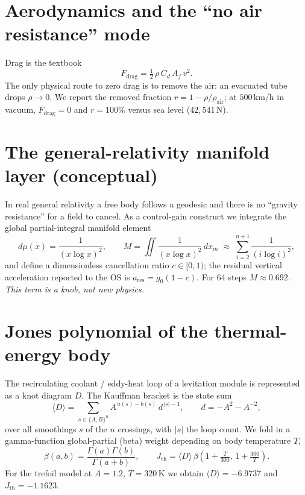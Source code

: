 \documentclass[11pt]{article}
\begin{document}
\section{Aerodynamics and the ``no air resistance'' mode}
Drag is the textbook
\begin{equation}
F_{\text{drag}}=\tfrac12\,\rho\,C_d\,A_f\,v^2 .
\end{equation}
The only physical route to zero drag is to remove the air: an evacuated tube
drops $\rho\to0$. We report the removed fraction
$r=1-\rho/\rho_{\text{air}}$; at $500\,$km/h in vacuum, $F_{\text{drag}}=0$ and
$r=100\%$ versus sea level ($42{,}541\,$N).

\section{The general-relativity manifold layer (conceptual)}
\label{sec:manifold}
In real general relativity a free body follows a geodesic and there is no
``gravity resistance'' for a field to cancel. As a control-gain construct we
integrate the global partial-integral manifold element
\begin{equation}
d\mu(x)=\frac{1}{(x\log x)^2},\qquad
M=\iint\frac{1}{(x\log x)^2}\,dx_m\;\approx\;\sum_{i=2}^{n+1}\frac{1}{(i\log i)^2},
\end{equation}
and define a dimensionless cancellation ratio $c\in[0,1)$; the residual vertical
acceleration reported to the OS is $a_{\text{res}}=g_0(1-c)$. For $64$ steps
$M\approx 0.692$. \emph{This term is a knob, not new physics.}

\section{Jones polynomial of the thermal-energy body}
The recirculating coolant / eddy-heat loop of a levitation module is represented
as a knot diagram $D$. The Kauffman bracket is the state sum
\begin{equation}
\langle D\rangle=\sum_{s\in\{A,B\}^{n}} A^{\,a(s)-b(s)}\,d^{\,|s|-1},
\qquad d=-A^2-A^{-2},
\end{equation}
over all smoothings $s$ of the $n$ crossings, with $|s|$ the loop count. We fold
in a gamma-function global-partial (beta) weight depending on body temperature
$T$,
\begin{equation}
\beta(a,b)=\frac{\Gamma(a)\Gamma(b)}{\Gamma(a+b)},\qquad
J_{\text{th}}=\langle D\rangle\,\beta\!\left(1+\tfrac{T}{300},\,1+\tfrac{300}{T}\right).
\end{equation}
For the trefoil model at $A=1.2$, $T=320\,$K we obtain
$\langle D\rangle=-6.9737$ and $J_{\text{th}}=-1.1623$.
\end{document}

